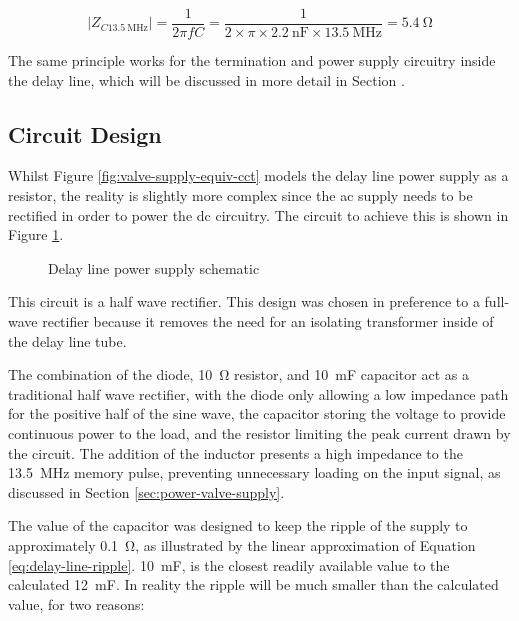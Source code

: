 \begin{equation}
| Z_{C\SI{13.5}{\mega\hertz}} | = \frac{1}{2 \pi f C} = \frac{1}{2 \times \pi \times \SI{2.2}{\nano\farad} \times \SI{13.5}{\mega\hertz}} = \SI{5.4}{\ohm} \label{eq:pulse-c-impedance} 
\end{equation}

The same principle works for the termination and power supply circuitry inside the delay line, which will be discussed in more detail in Section .

\subsection{Circuit Design} \label{sec:power-circuit}

Whilst Figure \ref{fig:valve-supply-equiv-cct} models the delay line power supply as a resistor, the reality is slightly more complex since the \gls{ac} supply needs to be rectified in order to power the \gls{dc} circuitry. The circuit to achieve this is shown in Figure \ref{fig:delay-line-psu-sch}.

\begin{figure}[ht]
	\centering
	\caption{Delay line power supply schematic }
	\label{fig:delay-line-psu-sch}
\end{figure}

This circuit is a half wave rectifier. This design was chosen in preference to a full-wave rectifier because it removes the need for an isolating transformer inside of the delay line tube.

The combination of the diode, \SI{10}{\ohm} resistor, and \SI{10}{\milli\farad} capacitor act as a traditional half wave rectifier, with the diode only allowing a low impedance path for the positive half of the sine wave, the capacitor storing the voltage to provide continuous power to the load, and the resistor limiting the peak current drawn by the circuit. The addition of the inductor presents a high impedance to the \SI{13.5}{\mega\hertz} memory pulse, preventing unnecessary loading on the input signal, as discussed in Section \ref{sec:power-valve-supply}.

The value of the capacitor was designed to keep the ripple of the supply to approximately \SI{0.1}{\ohm}, as illustrated by the linear approximation of Equation \ref{eq:delay-line-ripple}. \SI{10}{\milli\farad}, is the closest readily available value to the calculated \SI{12}{\milli\farad}. In reality the ripple will be much smaller than the calculated value, for two reasons:

